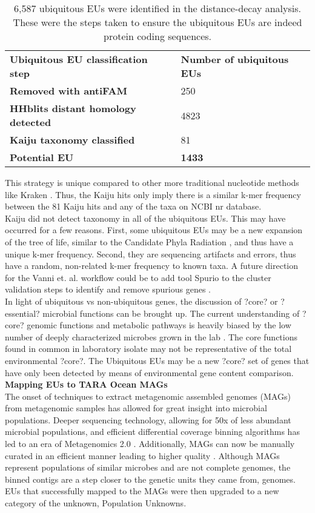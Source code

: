 \begin{table}[]
\centering
\caption{6,587 ubiquitous EUs were identified in the distance-decay analysis. These were the steps taken to ensure the ubiquitous EUs are indeed protein coding sequences.}
\label{my-label}
\begin{tabular}{ll}
\textbf{Ubiquitous EU classification step} & \textbf{Number of ubiquitous EUs} \\
\textbf{Removed with antiFAM} & 250 \\
\textbf{HHblits distant homology detected} & 4823 \\
\textbf{Kaiju taxonomy classified} & 81 \\
\textbf{Potential EU} & \textbf{1433}
\end{tabular}

This strategy is unique compared to other more traditional nucleotide methods like Kraken \citep{Wood_2014}. Thus, the Kaiju hits only imply there is a similar k-mer frequency between the 81 Kaiju hits and any of the taxa on NCBI nr database. \\
Kaiju did not detect taxonomy in all of the ubiquitous EUs. This may have occurred for a few reasons. First, some ubiquitous EUs may be a new expansion of the tree of life, similar to the Candidate Phyla Radiation \citep{Danczak_2017}, and thus have a unique k-mer frequency. Second, they are sequencing artifacts and errors, thus have a random, non-related k-mer frequency to known taxa. A future direction for the Vanni et. al. workflow could be to add tool Spurio to the cluster validation steps to identify and remove spurious genes \citep{H_ps_2018}. \\

In light of ubiquitous vs non-ubiquitous genes, the discussion of ?core? or ?essential? microbial functions can be brought up. The current understanding of ?core? genomic functions and metabolic pathways is heavily biased by the low number of deeply characterized microbes grown in the lab \citep{Prosser_2014}. The core functions found in common in laboratory isolate may not be representative of the total environmental ?core?. The Ubiquitous EUs may be a new ?core? set of genes that have only been detected by means of environmental gene content comparison. \\

\textbf{Mapping EUs to TARA Ocean MAGs}\\

The onset of techniques to extract metagenomic assembled genomes (MAGs) from metagenomic samples has allowed for great insight into microbial populations. Deeper sequencing technology, allowing for 50x of less abundant microbial populations, and efficient differential coverage binning algorithms has led to an era of Metagenomics 2.0 \citep{McMahon_2015}. Additionally, MAGs can now be manually curated in an efficient manner leading to higher quality \citep{Eren_2015}. Although MAGs represent populations of similar microbes and are not complete genomes, the binned contigs are a step closer to the genetic units they came from, genomes. EUs that successfully mapped to the \cite{Delmont_2017}  MAGs were then upgraded to a new category of the unknown, Population Unknowns.\\


\end{table}
